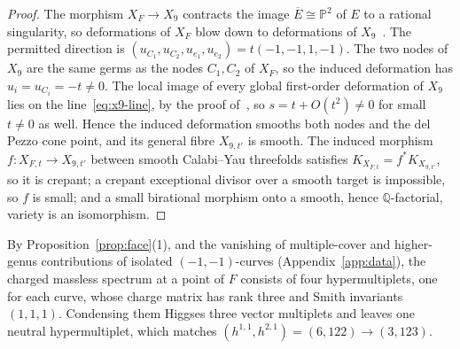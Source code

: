 \begin{proof}
The morphism $X_F\to X_9$ contracts the image $\overline E\cong\mathbb P^2$ of $E$ to a
rational singularity, so deformations of $X_F$ blow down to deformations of
$X_9$~\cite[Prop.~11.4]{KollarMori:1992}. The permitted direction is
$(u_{C_1},u_{C_2},u_{e_1},u_{e_2})=t(-1,-1,1,-1)$. The two nodes of $X_9$ are the same germs as
the nodes $C_1,C_2$ of $X_F$, so the induced deformation has $u_i=u_{C_i}=-t\neq0$. The local
image of every global first-order deformation of $X_9$ lies on the line~\eqref{eq:x9-line}, by
the proof of~\cite[Thm.~2.2]{W26quantum}, so $s=t+O(t^2)\neq0$ for small $t\neq0$ as well. Hence
the induced deformation smooths both nodes and the del Pezzo cone point, and its general fibre
$X_{9,t'}$ is smooth. The induced morphism $f:X_{F,t}\to X_{9,t'}$ between smooth Calabi--Yau
threefolds satisfies $K_{X_{F,t}}=f^*K_{X_{9,t'}}$, so it is crepant; a crepant exceptional divisor over a smooth
target is impossible, so $f$ is small; and a small birational morphism onto a smooth, hence
$\mathbb Q$-factorial, variety is an isomorphism.
\end{proof}

By Proposition~\ref{prop:face}(1), and the vanishing of multiple-cover and higher-genus
contributions of isolated $(-1,-1)$-curves (Appendix~\ref{app:data}), the charged massless
spectrum at a point of $F$ consists
of four hypermultiplets, one for each curve, whose charge matrix has rank three and Smith
invariants $(1,1,1)$. Condensing them Higgses three vector multiplets and leaves one neutral
hypermultiplet, which matches $(h^{1,1},h^{2,1})=(6,122)\to(3,123)$.
